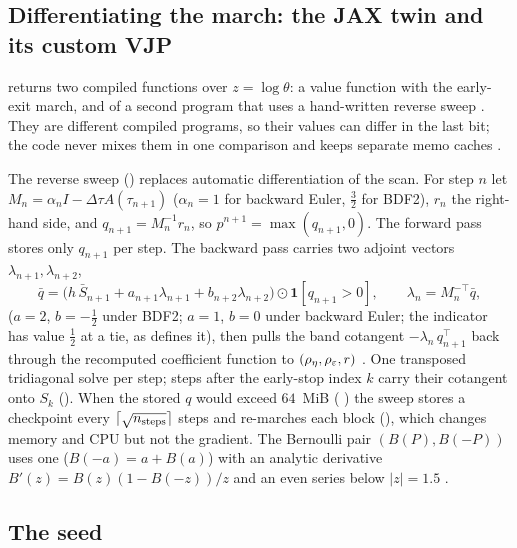 \subsection{Differentiating the march: the JAX twin and its custom VJP}\label{sec:pv-jax}

 returns two compiled functions over $z=\log\theta$: a value function with the
early-exit march, and  of a second program that uses a hand-written reverse sweep
. They are different compiled programs, so their values can differ in the
last bit; the code never mixes them in one comparison and keeps separate memo caches
.

The reverse sweep () replaces automatic differentiation of the scan.
For step $n$ let $M_n=\alpha_nI-\Delta\tau A(\tau_{n+1})$ ($\alpha_n=1$ for backward Euler, $\tfrac32$ for BDF2),
$r_n$ the right-hand side, and $q_{n+1}=M_n^{-1}r_n$, so $p^{n+1}=\max(q_{n+1},0)$. The forward pass stores only
$q_{n+1}$ per step. The backward pass carries two adjoint vectors $\lambda_{n+1},\lambda_{n+2}$,
\begin{equation}
  \bar q=\big(h\,\bar S_{n+1}+a_{n+1}\lambda_{n+1}+b_{n+2}\lambda_{n+2}\big)\odot\mathbf 1[q_{n+1}>0],
  \qquad \lambda_n=M_n^{-\top}\bar q,
\end{equation}
($a=2$, $b=-\tfrac12$ under BDF2; $a=1$, $b=0$ under backward Euler; the indicator has value $\tfrac12$ at a tie,
as  defines it), then pulls the band cotangent $-\lambda_n\,q_{n+1}^{\top}$ back through the
recomputed coefficient function to $(\rho_\eta,\rho_\varepsilon,r)$ . One transposed
tridiagonal solve per step; steps after the early-stop index $k$ carry their cotangent onto $S_k$
(). When the stored $q$ would exceed $64$~MiB (
) the sweep stores a checkpoint every $\lceil\sqrt{n_{\rm steps}}\rceil$ steps
and re-marches each block (), which changes memory and CPU but not the gradient.
The Bernoulli pair $(B(P),B(-P))$ uses one  ($B(-a)=a+B(a)$) with an analytic derivative
$B'(z)=B(z)(1-B(-z))/z$ and an even series below $|z|=1.5$ .

\subsection{The seed}\label{sec:pv-seed}

